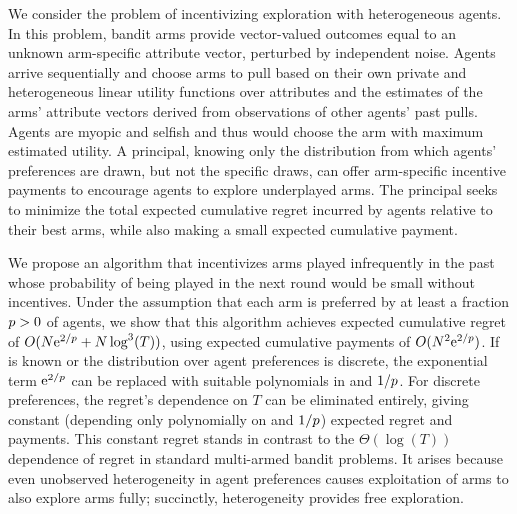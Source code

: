 We consider the problem of incentivizing exploration with heterogeneous agents.
In this problem, \ARMNUM bandit arms provide vector-valued outcomes equal to an unknown
arm-specific attribute vector,
perturbed by independent noise.
Agents arrive sequentially and choose arms to pull based on their own
private and heterogeneous linear utility functions over attributes
and the estimates of the arms' attribute vectors derived from
observations of other agents' past pulls.
Agents are myopic and selfish and thus would choose the arm with
maximum estimated utility.
A principal, knowing only the distribution from which agents'
preferences are drawn, but not the specific draws,
can offer arm-specific incentive payments 
to encourage agents to explore underplayed arms.
The principal seeks to minimize the total expected cumulative regret
incurred by agents relative to their best arms,
while also making a small expected cumulative payment.

We propose an algorithm that incentivizes arms played
  infrequently in the past
whose probability of being played in the next round would be small
without incentives.
Under the assumption that each arm is preferred by at
least a fraction $p > 0$ of agents,
we show that this algorithm achieves expected
cumulative regret of $O (N \mathrm{e}^{2/p} + N \log^3(T))$,
using expected cumulative payments of $O(N^2 \mathrm{e}^{2/p})$.
If \MinProb is known or the distribution over agent
preferences is discrete,
the exponential term $\mathrm{e}^{2/p}$ can be replaced with suitable
polynomials in \ARMNUM and $1/p$.
For discrete preferences, the regret's dependence on $T$ can be
eliminated entirely, giving constant (depending only polynomially on
\ARMNUM and $1/p$) expected regret and payments.
This constant regret stands in contrast to the $\Theta(\log(T))$ dependence of
regret in standard multi-armed bandit problems.
It arises because even unobserved heterogeneity in agent preferences
causes exploitation of arms to also explore arms fully;
succinctly, heterogeneity provides free exploration.
